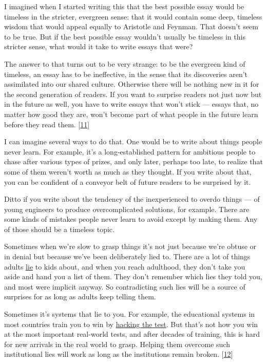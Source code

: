 I imagined when I started writing this that the best possible essay
would be timeless in the stricter, evergreen sense: that it would
contain some deep, timeless wisdom that would appeal equally to
Aristotle and Feynman. That doesn't seem to be true. But if the best
possible essay wouldn't usually be timeless in this stricter sense, what
would it take to write essays that were?

The answer to that turns out to be very strange: to be the evergreen
kind of timeless, an essay has to be ineffective, in the sense that its
discoveries aren't assimilated into our shared culture. Otherwise there
will be nothing new in it for the second generation of readers. If you
want to surprise readers not just now but in the future as well, you
have to write essays that won't stick --- essays that, no matter how
good they are, won't become part of what people in the future learn
before they read them. {[}\hyperref[f11n]{11}{]}

I can imagine several ways to do that. One would be to write about
things people never learn. For example, it's a long-established pattern
for ambitious people to chase after various types of prizes, and only
later, perhaps too late, to realize that some of them weren't worth as
much as they thought. If you write about that, you can be confident of a
conveyor belt of future readers to be surprised by it.

Ditto if you write about the tendency of the inexperienced to overdo
things --- of young engineers to produce overcomplicated solutions, for
example. There are some kinds of mistakes people never learn to avoid
except by making them. Any of those should be a timeless topic.

Sometimes when we're slow to grasp things it's not just because we're
obtuse or in denial but because we've been deliberately lied to. There
are a lot of things adults \href{lies.html}{lie} to kids about, and when
you reach adulthood, they don't take you aside and hand you a list of
them. They don't remember which lies they told you, and most were
implicit anyway. So contradicting such lies will be a source of
surprises for as long as adults keep telling them.

Sometimes it's systems that lie to you. For example, the educational
systems in most countries train you to win by \href{lesson.html}{hacking
the test}. But that's not how you win at the most important real-world
tests, and after decades of training, this is hard for new arrivals in
the real world to grasp. Helping them overcome such institutional lies
will work as long as the institutions remain broken.
{[}\hyperref[f12n]{12}{]}

